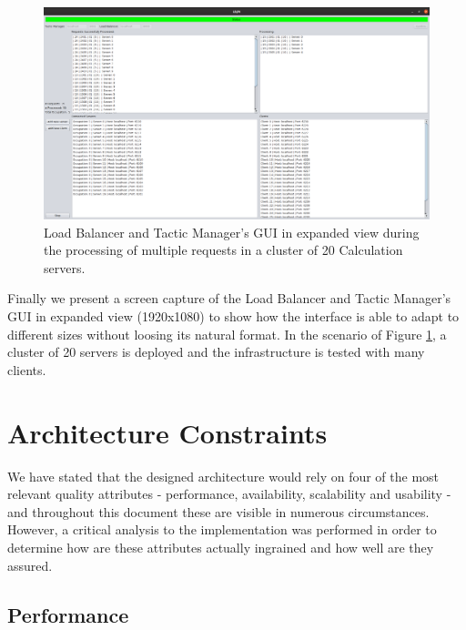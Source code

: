 \documentclass[12pt]{article}
\begin{document}
\begin{figure}[H]
  \centering
  \begin{minipage}{\textwidth}
    \centering
    \includegraphics[width=\linewidth]{img/LBM_large.png}
  \end{minipage}%
  \caption{Load Balancer and Tactic Manager's GUI in expanded view during the processing of multiple requests in a cluster of 20 Calculation servers.}
  \label{fig:LBM_large}
\end{figure}

Finally we present a screen capture of the Load Balancer and Tactic Manager's GUI in expanded view (1920x1080) to show how the interface is able to adapt to
different sizes without loosing its natural format.
In the scenario of Figure \ref{fig:LBM_large}, a cluster of 20 servers is deployed and the infrastructure is tested with many clients.

\newpage
\section{Architecture Constraints} \label{constraints} %

We have stated that the designed architecture would rely on four of the most relevant quality attributes - performance, availability, scalability and usability -
and throughout this document these are visible in numerous circumstances.
However, a critical analysis to the implementation was performed in order to determine how are these attributes actually ingrained and how well are they assured.

\subsection{Performance} \label{performance}
\end{document}
